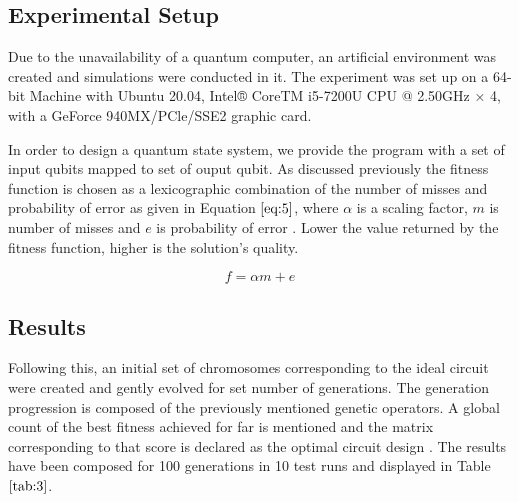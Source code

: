 \documentclass[conference]{IEEEtran}
\begin{document}
\subsection{Experimental Setup}
Due to the unavailability of a quantum computer, an artificial environment was created and simulations were conducted in it. The experiment was set up on a 64-bit Machine with Ubuntu 20.04, Intel® CoreTM i5-7200U CPU @ 2.50GHz × 4, with a GeForce 940MX/PCle/SSE2 graphic card. 

In order to design a quantum state system, we provide the program with a set of input qubits mapped to set of ouput qubit. As discussed previously the fitness function is chosen as a lexicographic combination of the number of misses and probability of error as given in Equation $\ref{eq:5}$, where $\alpha$ is a scaling factor, $\textit{m}$ is number of misses and $\textit{e}$ is probability of error \cite{lex}. Lower the value returned by the fitness function, higher is the solution's quality.

\begin{equation}
\label{eq:5}
f = \alpha m + e
\end{equation}


\subsection{Results}
Following this, an initial set of chromosomes corresponding to the ideal circuit were created and gently evolved for set number of generations. The generation progression is composed of the previously mentioned genetic operators. A global count of the best fitness achieved for far is mentioned and the matrix corresponding to that score is declared as the optimal circuit design \cite{cir}. The results have been composed for 100 generations in 10 test runs and displayed in Table $\ref{tab:3}$.  
\end{document}
